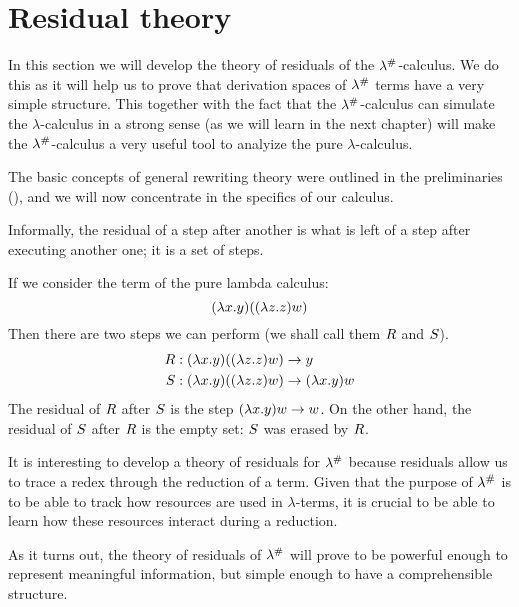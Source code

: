 \chapter{Residual theory}
In this section we will develop the theory of residuals of the $\lambda^{\mathtt{\#}}$-calculus.
We do this as it will help us to prove that derivation spaces of $\lambda^{\mathtt{\#}}$
terms have a very simple structure. This together with the fact that
the $\lambda^{\mathtt{\#}}$-calculus
can simulate the $\lambda$-calculus in a strong sense (as we will learn in the next chapter)
will make the $\lambda^{\mathtt{\#}}$-calculus a very useful tool
to analyize the pure $\lambda$-calculus.


The basic concepts of general rewriting theory were outlined in
the preliminaries (),
and we will now concentrate in the specifics of our calculus.

Informally, the residual of a step after another is what is left of a step after executing another one; it is a set of steps.

\begin{example} If we consider the term of the pure lambda calculus:
\[(\lambda x. y)((\lambda z. z) w)\]
Then there are two steps we can perform (we shall call them $R$ and $S$).
\begin{align*}
  R &:
    (\lambda x. y)((\lambda z. z) w) \to y \\
  S &:
    (\lambda x. y)((\lambda z. z) w) \to (\lambda x. y) w
\end{align*}
The residual of $R$ after $S$ is the step $(\lambda x. y) w \to w$.
On the other hand, the residual of $S$ after $R$ is the empty set:
$S$ was erased by $R$.
\end{example}

It is interesting to develop a theory of residuals for $\lambda^{\mathtt{\#}}$ because
residuals allow us to trace a redex through the reduction of a term.
Given that the purpose of $\lambda^{\mathtt{\#}}$ is to be able to track
how resources are used in $\lambda$-terms, it is crucial to
be able to learn how these resources interact during a reduction.

As it turns out, the theory of residuals of $\lambda^{\mathtt{\#}}$ will prove to be powerful
enough to represent meaningful information, but simple enough to have a
comprehensible structure.


